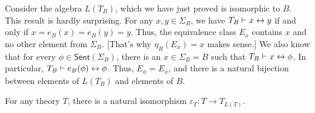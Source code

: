 \begin{disc} Consider the algebra $L(T_B)$, which we have just proved
  is isomorphic to $B$.  This result is hardly surprising.  For any
  $x,y\in \Sigma _B$, we have $T_B\vdash x\leftrightarrow y$ if and only if
  $x=e_B(x)=e_B(y)=y$.  Thus, the equivalence class $E_x$ contains $x$
  and no other element from $\Sigma _B$.  [That's why $\eta _B(E_x)=x$
  makes sense.]  We also know that for every
  $\phi\in\mathsf{Sent}(\Sigma _B)$, there is an $x\in \Sigma _B=B$
  such that $T_B\vdash x\leftrightarrow \phi$.  In particular, $T_B\vdash
  e_B(\phi)\leftrightarrow \phi$.  Thus, $E_\phi=E_x$, and there is a natural
  bijection between elements of $L(T_B)$ and elements of $B$.
\end{disc}


\begin{prop} For any theory $T$, there is a natural isomorphism
  $\varepsilon _T:T\to T_{L(T)}$. \end{prop}


